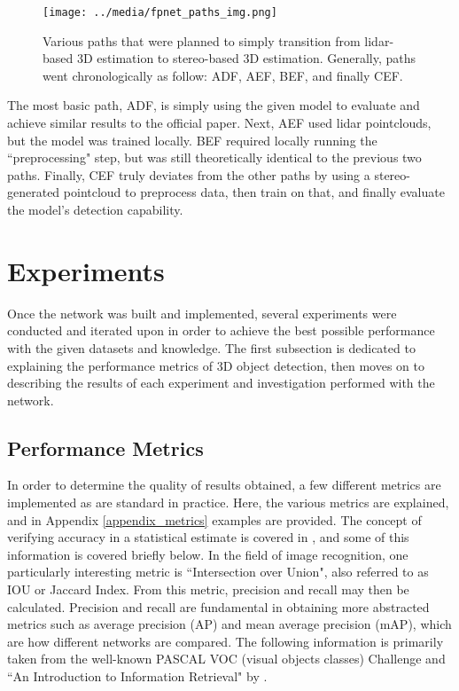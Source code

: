 \begin{figure}[H]
    \texttt{[image: ../media/fpnet\_paths\_img.png]}
    \caption{Various paths that were planned to simply transition from lidar-based 3D estimation to stereo-based 3D estimation. Generally, paths went chronologically as follow: ADF, AEF, BEF, and finally CEF.}
    \label{fp_paths}
\end{figure}

The most basic path, ADF, is simply using the given model to evaluate and achieve similar results to the official paper. Next, AEF used lidar pointclouds, but the model was trained locally. BEF required locally running the ``preprocessing" step, but was still theoretically identical to the previous two paths. Finally, CEF truly deviates from the other paths by using a stereo-generated pointcloud to preprocess data, then train on that, and finally evaluate the model's detection capability.


\newpage
\section{Experiments}
Once the network was built and implemented, several experiments were conducted and iterated upon in order to achieve the best possible performance with the given datasets and knowledge. The first subsection is dedicated to explaining the performance metrics of 3D object detection, then moves on to describing the results of each experiment and investigation performed with the network. 


\subsection{Performance Metrics}
In order to determine the quality of results obtained, a few different metrics are implemented as are standard in practice. Here, the various metrics are explained, and in Appendix \ref{appendix_metrics} examples are provided. The concept of verifying accuracy in a statistical estimate is covered in \cite{manning_introduction_2008}, and some of this information is covered briefly below. In the field of image recognition, one particularly interesting metric is ``Intersection over Union", also referred to as IOU or Jaccard Index. From this metric, precision and recall may then be calculated. Precision and recall are fundamental in obtaining more abstracted metrics such as average precision (AP) and mean average precision (mAP), which are how different networks are compared. The following information is primarily taken from the well-known PASCAL VOC (visual objects classes) Challenge \cite{everingham_pascal_2010} and ``An Introduction to Information Retrieval" by \cite{manning_introduction_2008}.

